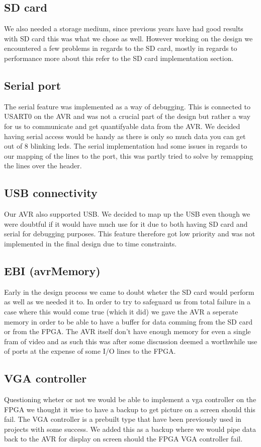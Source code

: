 \subsection{SD card}

We also needed a storage medium, since previous years have had good results with SD card this was what we chose as well. However working on the design we encountered a few problems in regards to the SD card, mostly in regards to performance more about this refer to the SD card implementation section.

\subsection{Serial port}

The serial feature was implemented as a way of debugging. This is connected to USART0 on the AVR and was not a crucial part of the design but rather a way for us to communicate and get quantifyable data from the AVR. We decided having serial access would be handy as there is only so much data you can get out of 8 blinking leds. The serial implementation had some issues in regards to our mapping of the lines to the port, this was partly tried to solve by remapping the lines over the header.

\subsection{USB connectivity}

Our AVR also supported USB. We decided to map up the USB even though we were doubtful if it would have much use for it due to both having SD card and serial for debugging purposes. This feature therefore got low priority and was not implemented in the final design due to time constraints.
 
\subsection{EBI (avrMemory)}

Early in the design process we came to doubt wheter the SD card would perform as well as we needed it to. In order to try to safeguard us from total failure in a case where this would come true (which it did) we gave the AVR a seperate memory in order to be able to have a buffer for data comming from the SD card or from the FPGA. The AVR itself don't have enough memory for even a single fram of video and as such this was after some discussion deemed a worthwhile use of ports at the expense of some I/O lines to the FPGA.

\subsection{VGA controller}

Questioning wheter or not we would be able to implement a vga controller on the FPGA we thought it wise to have a backup to get picture on a screen should this fail. The VGA controller is a prebuilt type that have been previously used in projects with some success. We added this as a backup where we would pipe data back to the AVR for display on screen should the FPGA VGA controller fail.


